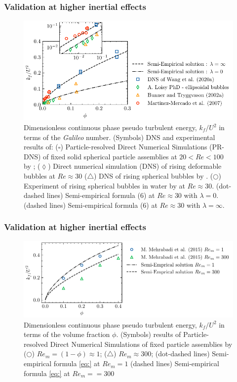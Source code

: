 \documentclass{sintefbeamer}
\begin{document}
\begin{frame}
  \frametitle{Validation at higher inertial effects }

  \begin{figure}
    \centering
    \includegraphics[height = 0.35\textwidth]{image/HOMOGENEOUS_final/CA/KFliterature.pdf}
    \caption{\footnotesize
      Dimensionless continuous phase pseudo turbulent energy, $k_f/U^2$ in terms of the \textit{Galileo} number.
    (Symbols) DNS and experimental results of: 
    ($\pmb\square$)  Particle-resolved Direct Numerical Simulations (PR-DNS)
    of fixed solid spherical particle assemblies at $20< Re < 100$  by \citet{wang2021numerical}; 
    ($\pmb\lozenge$) Direct numerical simulation (DNS) of rising deformable bubbles at $Re \approx 30$ \citep{loisy2016direct}
    ($\pmb\triangle$) DNS of rising spherical bubbles by \citet{bunner2002dynamics}. 
    ($\pmb\bigcirc$) Experiment of rising spherical bubbles in water by \citet{martinez2007measurement} at $Re \approx 30$. 
    (dot-dashed lines) Semi-empirical formula (6) at $Re \approx 30$ with $\lambda = 0$. 
    (dashed lines)  Semi-empirical formula (6) at $Re \approx 30$ with $\lambda = \infty$.
    }
    \label{fig:trygvason}
\end{figure}

\end{frame}
\begin{frame}
  \frametitle{Validation at higher inertial effects }

  \begin{figure}
    \centering
    \includegraphics[height = 0.25\textwidth]{image/HOMOGENEOUS_final/CA/tenneti.pdf}
    \caption{Dimensionless continuous phase pseudo turbulent energy, $k_f/U^2$ in terms of the volume fraction $\phi$.
    (Symbols) 
    results of Particle-resolved Direct Numerical Simulations
    of fixed particle assemblies by \citet{mehrabadi2015pseudo}
    ($\pmb\bigcirc$) $Re_m = (1-\phi) \approx 1$; ($\pmb\triangle$) $Re_m \approx 300$;
    (dot-dashed lines) Semi-empirical formula \ref{eq:} at $Re_m = 1$
    (dashed lines) Semi-empirical formula \ref{eq:} at $Re_m= = 300$
    }
    \label{fig:tennet}
\end{figure}

\end{frame}
\end{document}
